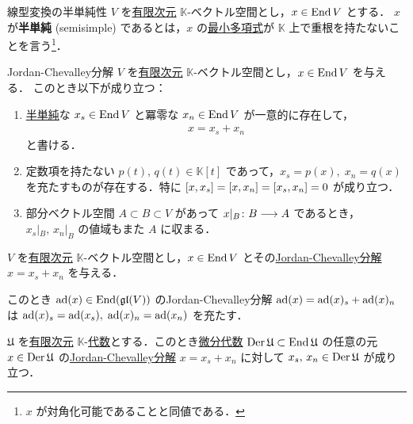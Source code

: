 \documentclass[rep_main]{subfiles}
\begin{document}
\begin{mydef}[label=def:semisimple-end]{線型変換の半単純性}
	$V$ を\underline{有限次元} $\mathbb{K}$-ベクトル空間とし，$x \in \operatorname{End} V$ とする．
	$x$ が\textbf{半単純} (semisimple) であるとは，$x$ の\hyperref[def:minimal-poly]{最小多項式}が $\mathbb{K}$ 上で重根を持たないことを言う\footnote{$x$ が対角化可能であることと同値である．}．
\end{mydef}


\begin{myprop}[label=prop:Jordan-Chevalley]{Jordan-Chevalley分解}
	$V$ を\underline{有限次元} $\mathbb{K}$-ベクトル空間とし，$x \in \operatorname{End} V$ を与える．
	このとき以下が成り立つ：
	\begin{enumerate}
		\item \hyperref[def:semisimple-end]{半単純}な $x_s \in \operatorname{End} V$ と冪零な $x_n \in \operatorname{End} V$ が一意的に存在して，
		\begin{align}
			x = x_s + x_n
		\end{align}
		と書ける．
		\item 定数項を持たない $p(t),\, q(t) \in \mathbb{K}[t]$ であって，$x_s = p(x),\; x_n = q(x)$ を充たすものが存在する．特に $\comm{x}{x_s} = \comm{x}{x_n} = \comm{x_s}{x_n} = 0$ が成り立つ．
		\item 部分ベクトル空間 $A \subset B \subset V$ があって $x|_B \colon B \longrightarrow A$ であるとき，$x_s|_B,\, x_n|_B$ の値域もまた $A$ に収まる．
	\end{enumerate}
\end{myprop}

\begin{mylem}[label=lem:JC-1]{}
	$V$ を\underline{有限次元} $\mathbb{K}$-ベクトル空間とし，$x \in \operatorname{End} V$ とその\hyperref[prop:Jordan-Chevalley]{Jordan-Chevalley分解} $x = x_s + x_n$ を与える．

	このとき $\operatorname{ad} (x) \in \operatorname{End} (\mathfrak{gl} (V))$ のJordan-Chevalley分解 $\operatorname{ad}(x) = \operatorname{ad}(x)_s + \operatorname{ad}(x)_n$ は $\operatorname{ad}(x)_s = \operatorname{ad}(x_s),\; \operatorname{ad}(x)_n = \operatorname{ad}(x_n)$ を充たす．
\end{mylem}


\begin{mylem}[label=lem:JC-2]{}
	$\mathfrak{U}$ を\underline{有限次元} $\mathbb{K}$-\hyperref[ax:Alg]{代数}とする．このとき\hyperref[prop:Der-LieAlg]{微分代数} $\operatorname{Der} \mathfrak{U} \subset \operatorname{End} \mathfrak{U}$ の任意の元 $x \in \operatorname{Der} \mathfrak{U}$ の\hyperref[prop:Jordan-Chevalley]{Jordan-Chevalley分解} $x = x_s + x_n$ に対して $x_s,\, x_n \in \operatorname{Der} \mathfrak{U}$ が成り立つ．
\end{mylem}
\end{document}
